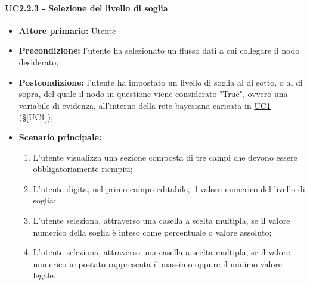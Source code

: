 \paragraph{UC2.2.3 - Selezione del livello di soglia}\label{UC2.2.3}
\begin{itemize}
\item \textbf{Attore primario:} Utente
\item \textbf{Precondizione:} l'utente ha selezionato un flusso dati a cui collegare il nodo desiderato;
\item \textbf{Postcondizione:} l'utente ha impostato un livello di soglia al di sotto, o al di sopra, 	del quale il nodo in questione viene considerato "True", ovvero una variabile di evidenza, all'interno della rete 	bayesiana caricata in \hyperref[UC1]{UC1 (§\ref*{UC1})};
\item \textbf{Scenario principale:}
	\begin{enumerate}
	\item L'utente visualizza una sezione composta di tre campi che devono essere obbligatoriamente riempiti;
	\item L'utente digita, nel primo campo editabile, il valore numerico del livello di soglia;
	\item L'utente seleziona, attraverso una casella a scelta multipla, se il valore numerico della soglia è inteso 				come percentuale o valore assoluto;
	\item L'utente seleziona, attraverso una casella a scelta multipla, se il valore numerico impostato rappresenta 				il massimo oppure il minimo valore legale.
	\end{enumerate}
\end{itemize}

